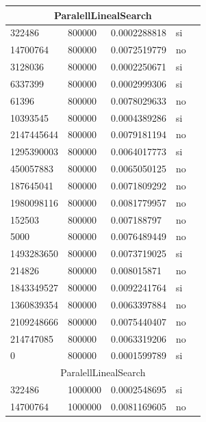 \documentclass[12pt, fleqn]{article}                             %
\theoremstyle{break}                                            %
\begin{document}
\begin{longtable}{|m{5em}|m{5em}|m{10em}|m{5em}|@{}m{0pt}@{}}
            \multicolumn{5}{|c|}{ParalellLinealSearch}   \\          \hline
            322486& 800000  & 0.0002288818 & si &\\[1em]    \hline
            14700764& 800000  & 0.0072519779 & no &\\[1em]    \hline
            3128036& 800000  & 0.0002250671 & si &\\[1em]    \hline
            6337399& 800000  & 0.0002999306 & si &\\[1em]    \hline
            61396& 800000  & 0.0078029633 & no &\\[1em]    \hline
            10393545& 800000  & 0.0004389286 & si &\\[1em]    \hline
            2147445644& 800000  & 0.0079181194 & no &\\[1em]    \hline
            1295390003& 800000  & 0.0064017773 & si &\\[1em]    \hline
            450057883& 800000  & 0.0065050125 & no &\\[1em]    \hline
            187645041& 800000  & 0.0071809292 & no &\\[1em]    \hline
            1980098116& 800000  & 0.0081779957 & no &\\[1em]    \hline
            152503& 800000  & 0.007188797 & no &\\[1em]    \hline
            5000& 800000  & 0.0076489449 & no &\\[1em]    \hline
            1493283650& 800000  & 0.0073719025 & si &\\[1em]    \hline
            214826& 800000  & 0.008015871 & no &\\[1em]    \hline
            1843349527& 800000  & 0.0092241764 & si &\\[1em]    \hline
            1360839354& 800000  & 0.0063397884 & no &\\[1em]    \hline
            2109248666& 800000  & 0.0075440407 & no &\\[1em]    \hline
            214747085& 800000  & 0.0063319206 & no &\\[1em]    \hline
            0& 800000  & 0.0001599789 & si &\\[1em]    \hline
            \multicolumn{5}{|c|}{ParalellLinealSearch}   \\          \hline
            322486& 1000000  & 0.0002548695 & si &\\[1em]    \hline
            14700764& 1000000  & 0.0081169605 & no &\\[1em]    \hline

\end{longtable}
\end{document}
